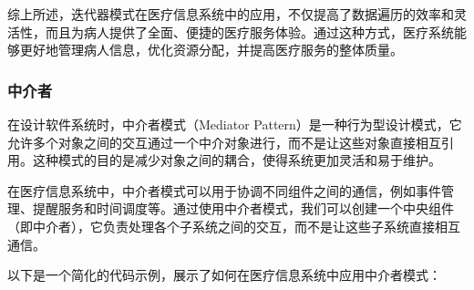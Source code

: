 综上所述，迭代器模式在医疗信息系统中的应用，不仅提高了数据遍历的效率和灵活性，而且为病人提供了全面、便捷的医疗服务体验。通过这种方式，医疗系统能够更好地管理病人信息，优化资源分配，并提高医疗服务的整体质量。

\subsubsection{中介者}

在设计软件系统时，中介者模式（Mediator Pattern）是一种行为型设计模式，它允许多个对象之间的交互通过一个中介对象进行，而不是让这些对象直接相互引用。这种模式的目的是减少对象之间的耦合，使得系统更加灵活和易于维护。

在医疗信息系统中，中介者模式可以用于协调不同组件之间的通信，例如事件管理、提醒服务和时间调度等。通过使用中介者模式，我们可以创建一个中央组件（即中介者），它负责处理各个子系统之间的交互，而不是让这些子系统直接相互通信。

以下是一个简化的代码示例，展示了如何在医疗信息系统中应用中介者模式：

